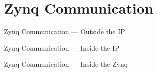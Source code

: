\documentclass{beamer}
\begin{document}
\section{Zynq Communication}
\begin{frame}{Zynq Communication --- Outside the IP}
\end{frame}
\begin{frame}{Zynq Communication --- Inside the IP}
\end{frame}
\begin{frame}{Zynq Communication --- Inside the Zynq}
\end{frame}
\end{document}
